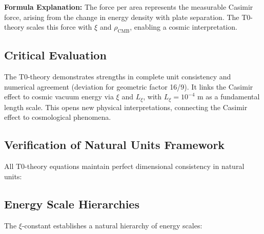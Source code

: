 	\textbf{Formula Explanation:} The force per area represents the measurable Casimir force, arising from the change in energy density with plate separation. The T0-theory scales this force with $\xi$ and $\rho_{\text{CMB}}$, enabling a cosmic interpretation.
	
	\subsection{Critical Evaluation}
	The T0-theory demonstrates strengths in complete unit consistency and numerical agreement (deviation for geometric factor 16/9). It links the Casimir effect to cosmic vacuum energy via $\xi$ and $L_\xi$, with $L_\xi = 10^{-4}$ m as a fundamental length scale. This opens new physical interpretations, connecting the Casimir effect to cosmological phenomena.
	
	\subsection{Verification of Natural Units Framework}
	
	All T0-theory equations maintain perfect dimensional consistency in natural units:
	
	\begin{table}[h]
		\centering
		\caption{Dimensional consistency in natural units}
	\end{table}
	
	\subsection{Energy Scale Hierarchies}
	
	The $\xi$-constant establishes a natural hierarchy of energy scales:
	
